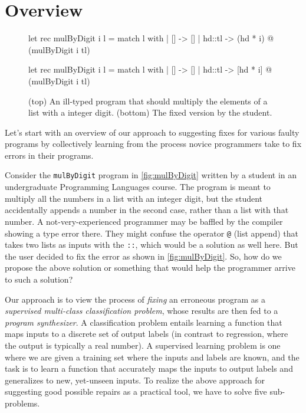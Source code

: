 \section{Overview}
\label{sec:overview}

\begin{figure}[ht]
    \begin{ecode}
      let rec mulByDigit i l =
        match l with
        | []     -> []
        | hd::tl -> (hd * i) @ (mulByDigit i tl)
    \end{ecode}

    \begin{ecode}
        let rec mulByDigit i l =
        match l with
        | []     -> []
        | hd::tl -> [hd * i] @ (mulByDigit i tl)
    \end{ecode}
    \caption{(top) An ill-typed \ocaml program that should multiply the elements of a list with a integer digit.
    (bottom) The fixed version by the student.}
    \label{fig:mulByDigit}
\end{figure}


Let’s start with an overview of our approach to suggesting fixes for various faulty programs by collectively learning
from the process novice programmers take to fix errors in their programs.

 Consider the \texttt{mulByDigit} program in \autoref{fig:mulByDigit} written by a student in an
undergraduate Programming Languages course. The program is meant to multiply all the numbers in a list with an integer
digit, but the student accidentally appends a number in the second case, rather than a list with that number. A
not-very-experienced programmer may be baffled by the compiler showing a type error there. They might confuse the
operator \texttt{@} (list append) that takes two lists as inputs with the \texttt{::}, which would be a solution as well
here. But the user decided to fix the error as shown in \autoref{fig:mulByDigit}. So, how do we propose the above
solution or something that would help the programmer arrive to such a solution?

 Our approach is to view the
process of \emph{fixing} an erroneous program as a \emph{supervised multi-class classification problem}, whose results
are then fed to a \emph{program synthesizer}. A classification problem entails learning a function that maps inputs to a
discrete set of output labels (in contrast to regression, where the output is typically a real number). A supervised
learning problem is one where we are given a training set where the inputs and labels are known, and the task is to
learn a function that accurately maps the inputs to output labels and generalizes to new, yet-unseen inputs. To realize
the above approach for suggesting good possible repairs as a practical tool, we have to solve five sub-problems.


